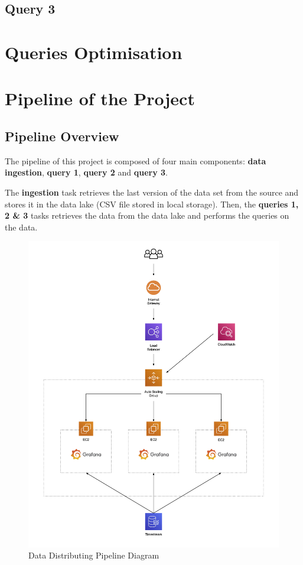 \documentclass[12pt,oneside]{book} %
\begin{document}
\subsection{Query 3}

\newpage

\section{Queries Optimisation}

\newpage

\section{Pipeline of the Project}
\subsection{Pipeline Overview}

The pipeline of this project is composed of four main components: \textbf{data
    ingestion}, \textbf{query 1}, \textbf{query 2} and \textbf{query 3}.\newline

The \textbf{ingestion} task retrieves the last version of the data set from the
source and stores it in the data lake (CSV file stored in local storage). Then,
the \textbf{queries 1, 2 \& 3} tasks retrieves the data from the data lake and
performs the queries on the data.

\begin{figure}[h]
    \centering
    \includegraphics[width=1\linewidth]{images/cloud-computing-clients.png}
    \caption{Data Distributing Pipeline Diagram}
\end{figure}
\end{document}
